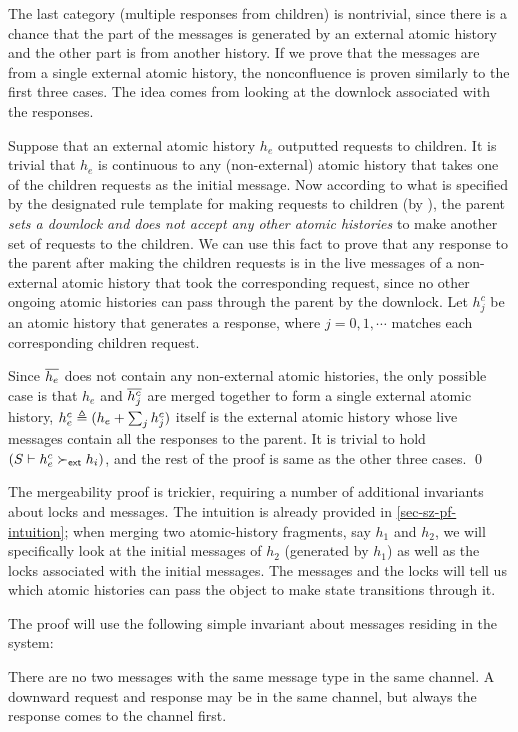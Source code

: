 The last category (multiple responses from children) is nontrivial, since there is a chance that the part of the messages is generated by an external atomic history and the other part is from another history.
If we prove that the messages are from a single external atomic history, the nonconfluence is proven similarly to the first three cases.
The idea comes from looking at the downlock associated with the responses.

Suppose that an external atomic history $h_e$ outputted requests to children.
It is trivial that $h_e$ is continuous to any (non-external) atomic history that takes one of the children requests as the initial message.
Now according to what is specified by the designated rule template for making requests to children (by ), the parent \emph{sets a downlock and does not accept any other atomic histories} to make another set of requests to the children.
We can use this fact to prove that any response to the parent after making the children requests is in the live messages of a non-external atomic history that took the corresponding request, since no other ongoing atomic histories can pass through the parent by the downlock.
Let $h^c_j$ be an atomic history that generates a response, where $j=0,1,\cdots$ matches each corresponding children request.

Since $\overline{h_e}$ does not contain any non-external atomic histories, the only possible case is that $h_e$ and $\overline{h^c_j}$ are merged together to form a single external atomic history, \ie{} $h^c_e \triangleq (h_e + \sum_j h^c_j)$ itself is the external atomic history whose live messages contain all the responses to the parent.
It is trivial to hold $(S \vdash h^c_e \succ_{\textsf{ext}} h_i)$, and the rest of the proof is same as the other three cases.
\renewcommand\qedsymbol{${\color{mygray}\textit{(End of the nonconfluence proof)}}\ \blacksquare$}
\qed{}
\renewcommand\qedsymbol{$\blacksquare$}

The mergeability proof is trickier, requiring a number of additional invariants about locks and messages.
The intuition is already provided in \autoref{sec-sz-pf-intuition}; when merging two atomic-history fragments, say $h_1$ and $h_2$, we will specifically look at the initial messages of $h_2$ (generated by $h_1$) as well as the locks associated with the initial messages.
The messages and the locks will tell us which atomic histories can pass the object to make state transitions through it.

The proof will use the following simple invariant about messages residing in the system:
\begin{invariant}\label{inv-same-type-msgs}
  There are no two messages with the same message type in the same channel.
  A downward request and response may be in the same channel, but always the response comes to the channel first.
\end{invariant}

